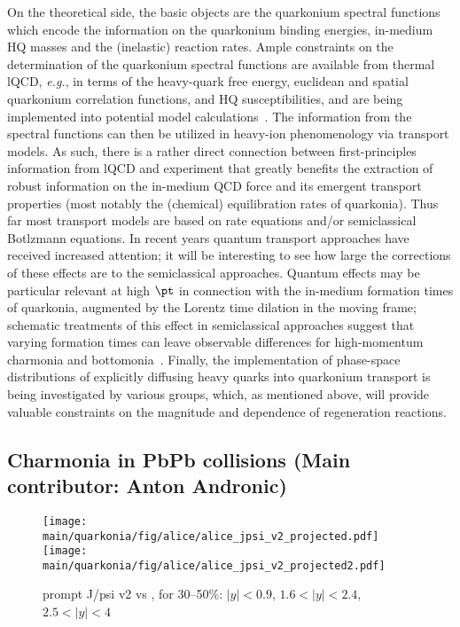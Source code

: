 \documentclass[../report.tex]{subfiles}
\providecommand{\main}{..}
\begin{document}
On the theoretical side, the basic objects are the quarkonium spectral functions which 
encode the information on the quarkonium binding energies, in-medium HQ masses and the
(inelastic) reaction rates. Ample constraints on the determination of the quarkonium
spectral functions are available from thermal lQCD, {\it e.g.}, in terms of the heavy-quark
free energy, euclidean and spatial quarkonium correlation functions, and HQ susceptibilities,
and are being implemented into potential model 
calculations~\cite{Wong:2004zr,Mocsy:2005qw,Alberico:2006vw,Brambilla:2008cx,Riek:2010py,Burnier:2015tda,Liu:2017qah}.
The information from the spectral functions can then be utilized in heavy-ion phenomenology
via transport models. As such, there is a rather direct connection between first-principles
information from lQCD and experiment that greatly benefits the extraction of robust information 
on the in-medium QCD force and its emergent transport properties (most notably the (chemical)
equilibration rates of quarkonia). 
Thus far most transport models are based on rate equations and/or
semiclassical Botlzmann equations. In recent years quantum transport approaches have 
received increased attention; it will be interesting to see how large the corrections
of these effects are to the semiclassical approaches. Quantum effects may be particular 
relevant at high $\pt$ in connection with the in-medium formation times of quarkonia, 
augmented by the Lorentz time dilation in the moving frame; schematic treatments of
this effect in semiclassical approaches suggest that varying formation times can leave 
observable differences for high-momentum charmonia and 
bottomonia~\cite{Song:2015bja,Hoelck:2016tqf,Du:2017qkv,Aronson:2017ymv,Krouppa:2017jlg}. 
Finally, the implementation of phase-space distributions of explicitly diffusing heavy quarks 
into quarkonium transport is being investigated by various groups, which, as mentioned above, 
will provide valuable constraints on the magnitude and \pt dependence of regeneration 
reactions.   

\subsection{Charmonia in PbPb collisions (Main contributor: Anton Andronic)}


\begin{figure}

\begin{center}
 \texttt{[image: \\main/quarkonia/fig/alice/alice\_jpsi\_v2\_projected.pdf]}
 \texttt{[image: \\main/quarkonia/fig/alice/alice\_jpsi\_v2\_projected2.pdf]}
\end{center}

 \caption{prompt J/psi v2 vs \pt, for 30--50\%: $|y|<0.9$, $1.6<|y|<2.4$, $2.5<|y|<4$~\cite{Abelevetal:2014cna,CERN-LHCC-2013-014}}
\end{figure}
\end{document}
